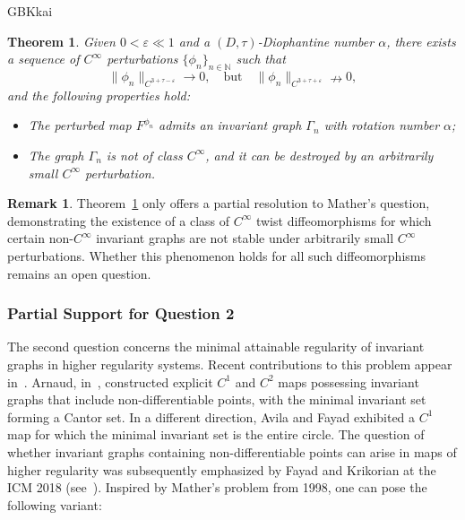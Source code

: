 \documentclass{amsart}
\newtheorem{Theorem}{Theorem}
\theoremstyle{definition}
\newtheorem{Remark}[Definition]{Remark}
\begin{document}
\begin{CJK*}{GBK}{kai}
		\begin{Theorem}\label{M1}
			Given \( 0 < \varepsilon \ll 1 \) and a \((D, \tau)\)-Diophantine number $\alpha$, there exists a sequence of \( C^\infty \) perturbations \( \{\phi_n\}_{n \in \mathbb{N}} \) such that
			\[
			\|\phi_n\|_{C^{3+\tau-\varepsilon}} \to 0, \quad \text{but} \quad \|\phi_n\|_{C^{3+\tau+\varepsilon}} \nrightarrow 0,
			\]
			and the following properties hold:
			\begin{itemize}
				\item The perturbed map \( F^{\phi_n} \) admits an invariant graph \( {\Gamma}_n \) with rotation number \( \alpha \);
				\item The graph \( {\Gamma}_n \) is not of class \( C^\infty \), and it can be destroyed by an arbitrarily small \( C^\infty \) perturbation.
			\end{itemize}
		\end{Theorem}
		
		\vspace{1ex}
		\begin{Remark}
			Theorem~\ref{M1} only offers a partial resolution to Mather's question, demonstrating the existence of a class of \( C^\infty \) twist diffeomorphisms for which certain non-\( C^\infty \) invariant graphs are not stable under arbitrarily small \( C^\infty \) perturbations. Whether this phenomenon holds for all such diffeomorphisms remains an open question.
		\end{Remark}
		
		\subsubsection{Partial Support for Question 2}
		
		The second question concerns the minimal attainable regularity of invariant graphs in higher regularity systems. Recent contributions to this problem appear in~\cite{Arna2,Arna14,AF}. Arnaud, in~\cite{Arna2,Arna14}, constructed explicit $C^1$ and $C^2$ maps possessing invariant graphs that include non-differentiable points, with the minimal invariant set forming a Cantor set. In a different direction, Avila and Fayad exhibited a $C^1$ map for which the minimal invariant set is the entire circle. The  question of whether invariant graphs containing non-differentiable points can arise in maps of higher regularity was subsequently emphasized by Fayad and Krikorian at the ICM 2018 (see~\cite[Question 26]{FKO}). Inspired by Mather's problem from 1998, one can pose the following variant:
		

\end{CJK*}
\end{document}
